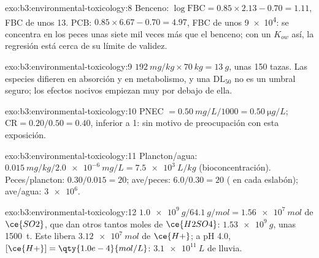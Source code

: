 \begin{solution}{exo:b3:environmental-toxicology:8}
Benceno: $\log\mathrm{FBC} = 0.85 \times 2.13 - 0.70 = 1.11$, FBC de unos 13. PCB: $0.85 \times 6.67 - 0.70 = 4.97$, FBC de unos
\num{9e4}: se concentra en los peces unas siete mil veces más que el benceno; con un $K_{ow}$ así,
la regresión está cerca de su límite de validez.
\end{solution}

\begin{solution}{exo:b3:environmental-toxicology:9}
$\qty{192}{mg/kg} \times \qty{70}{kg} = \qty{13}{g}$, unas 150 tazas. Las especies difieren en absorción y en metabolismo,
y una $\mathrm{DL_{50}}$ no es un umbral seguro; los efectos nocivos empiezan muy por debajo de ella.
\end{solution}

\begin{solution}{exo:b3:environmental-toxicology:10}
PNEC $= \qty{0.50}{mg/L}/1000 = \qty{0.50}{\micro g/L}$; $\mathrm{CR} = 0.20/0.50 = 0.40$, inferior a 1: sin motivo de preocupación con esta exposición.
\end{solution}

\begin{solution}{exo:b3:environmental-toxicology:11}
Plancton/agua: $\qty{0.015}{mg/kg}/\qty{2.0e-6}{mg/L} = \qty{7.5e3}{L/kg}$ (bioconcentración). Peces/plancton: $0.30/0.015 = 20$;
ave/peces: $6.0/0.30 = 20$ ( en cada eslabón); ave/agua: $\num{3e6}$.
\end{solution}

\begin{solution}{exo:b3:environmental-toxicology:12}
$\qty{1.0e9}{g}/\qty{64.1}{g/mol} = \qty{1.56e7}{mol}$ de $\ce{SO2}$, que dan otros tantos moles de $\ce{H2SO4}$: $\qty{1.53e9}{g}$, unas \qty{1500}{t}. Este
libera $\qty{3.12e7}{mol}$ de $\ce{H+}$; a pH 4.0, $[\ce{H+}] = \qty{1.0e-4}{mol/L}$: $\qty{3.1e11}{L}$ de lluvia.
\end{solution}

